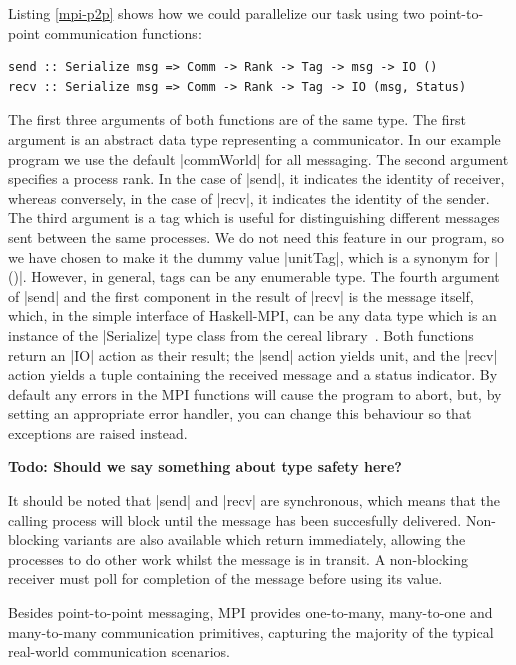 \documentclass{tmr}
\newcommand{\Todo}[1]{{\textbf{Todo: #1}}}
\begin{document}
Listing \ref{mpi-p2p} shows how we could parallelize our task using
two point-to-point communication functions:
\begin{Verbatim}
send :: Serialize msg => Comm -> Rank -> Tag -> msg -> IO ()
recv :: Serialize msg => Comm -> Rank -> Tag -> IO (msg, Status)
\end{Verbatim}
The first three arguments of both functions are of the same type.
The first argument is an abstract data
type representing a communicator. In our example program we use
the default |commWorld| for all messaging. The second argument
specifies a process rank. In the case of |send|, it indicates
the identity of receiver, whereas conversely, in the case
of |recv|, it indicates the identity of the sender.
The third argument is a tag which is useful for distinguishing
different messages sent between the same processes.
We do not need this feature in our program, so we have chosen
to make it the dummy value |unitTag|, which is a synonym for |()|.
However, in general, tags can be any enumerable type.
The fourth argument of |send| and the first component in
the result of |recv| is the message itself, which,
in the simple interface of Haskell-MPI, can be any
data type which is an instance of the |Serialize| type class
from the cereal library~\cite{cereal}. Both functions return
an |IO| action as their result; the |send| action yields
unit, and the |recv| action yields a tuple containing
the received message and a status indicator.
By default any errors in
the MPI functions will cause the program to abort, but, by
setting an appropriate error handler, you can
change this behaviour so that exceptions are raised instead.

\Todo{Should we say something about type safety here?}

It should be noted that |send| and |recv| are synchronous,
which means that the calling process will block until the message has been
succesfully delivered. Non-blocking variants are also available which
return immediately, allowing the processes to do other work whilst
the message is in transit. A non-blocking receiver must poll for
completion of the message before using its value.

Besides point-to-point messaging, MPI
provides one-to-many, many-to-one and many-to-many communication
primitives, capturing the majority of the typical real-world communication
scenarios.
\end{document}
